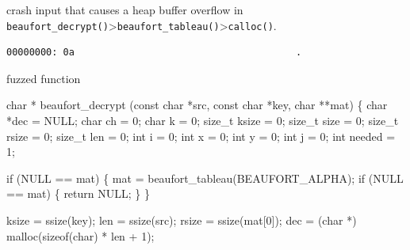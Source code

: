 \documentclass[
  a4paper,
]{scrreprt}
\newenvironment{Shaded}{\begin{snugshade}}{\end{snugshade}}
\newcommand{\ControlFlowTok}[1]{\textcolor[rgb]{0.85,0.12,0.09}{#1}}
\newcommand{\DataTypeTok}[1]{\textcolor[rgb]{0.47,0.16,0.63}{#1}}
\newcommand{\DecValTok}[1]{\textcolor[rgb]{0.47,0.16,0.63}{#1}}
\newcommand{\KeywordTok}[1]{\textcolor[rgb]{0.85,0.12,0.09}{#1}}
\newcommand{\NormalTok}[1]{\textcolor[rgb]{0.33,0.33,0.33}{#1}}
\newcommand{\OperatorTok}[1]{\textcolor[rgb]{0.00,0.46,0.62}{#1}}
\theoremstyle{definition}
\theoremstyle{remark}
\begin{document}
crash input that causes a heap buffer overflow in
\texttt{beaufort\_decrypt()}\textgreater{}\texttt{beaufort\_tableau()}\textgreater{}\texttt{calloc()}.

\begin{verbatim}
00000000: 0a                                       .
\end{verbatim}

fuzzed function

\begin{Shaded}
\begin{Highlighting}[numbers=left,,]

\DataTypeTok{char} \OperatorTok{*}
\NormalTok{beaufort\_decrypt }\OperatorTok{(}\DataTypeTok{const} \DataTypeTok{char} \OperatorTok{*}\NormalTok{src}\OperatorTok{,} \DataTypeTok{const} \DataTypeTok{char} \OperatorTok{*}\NormalTok{key}\OperatorTok{,} \DataTypeTok{char} \OperatorTok{**}\NormalTok{mat}\OperatorTok{)} \OperatorTok{\{}
  \DataTypeTok{char} \OperatorTok{*}\NormalTok{dec }\OperatorTok{=}\NormalTok{ NULL}\OperatorTok{;}
  \DataTypeTok{char}\NormalTok{ ch }\OperatorTok{=} \DecValTok{0}\OperatorTok{;}
  \DataTypeTok{char}\NormalTok{ k }\OperatorTok{=} \DecValTok{0}\OperatorTok{;}
  \DataTypeTok{size\_t}\NormalTok{ ksize }\OperatorTok{=} \DecValTok{0}\OperatorTok{;}
  \DataTypeTok{size\_t}\NormalTok{ size }\OperatorTok{=} \DecValTok{0}\OperatorTok{;}
  \DataTypeTok{size\_t}\NormalTok{ rsize }\OperatorTok{=} \DecValTok{0}\OperatorTok{;}
  \DataTypeTok{size\_t}\NormalTok{ len }\OperatorTok{=} \DecValTok{0}\OperatorTok{;}
  \DataTypeTok{int}\NormalTok{ i }\OperatorTok{=} \DecValTok{0}\OperatorTok{;}
  \DataTypeTok{int}\NormalTok{ x }\OperatorTok{=} \DecValTok{0}\OperatorTok{;}
  \DataTypeTok{int}\NormalTok{ y }\OperatorTok{=} \DecValTok{0}\OperatorTok{;}
  \DataTypeTok{int}\NormalTok{ j }\OperatorTok{=} \DecValTok{0}\OperatorTok{;}
  \DataTypeTok{int}\NormalTok{ needed }\OperatorTok{=} \DecValTok{1}\OperatorTok{;}

  \ControlFlowTok{if} \OperatorTok{(}\NormalTok{NULL }\OperatorTok{==}\NormalTok{ mat}\OperatorTok{)} \OperatorTok{\{}
\NormalTok{    mat }\OperatorTok{=}\NormalTok{ beaufort\_tableau}\OperatorTok{(}\NormalTok{BEAUFORT\_ALPHA}\OperatorTok{);}
    \ControlFlowTok{if} \OperatorTok{(}\NormalTok{NULL }\OperatorTok{==}\NormalTok{ mat}\OperatorTok{)} \OperatorTok{\{} \ControlFlowTok{return}\NormalTok{ NULL}\OperatorTok{;} \OperatorTok{\}}
  \OperatorTok{\}}

\NormalTok{  ksize }\OperatorTok{=}\NormalTok{ ssize}\OperatorTok{(}\NormalTok{key}\OperatorTok{);}
\NormalTok{  len }\OperatorTok{=}\NormalTok{ ssize}\OperatorTok{(}\NormalTok{src}\OperatorTok{);}
\NormalTok{  rsize }\OperatorTok{=}\NormalTok{ ssize}\OperatorTok{(}\NormalTok{mat}\OperatorTok{[}\DecValTok{0}\OperatorTok{]);}
\NormalTok{  dec }\OperatorTok{=} \OperatorTok{(}\DataTypeTok{char} \OperatorTok{*)}\NormalTok{ malloc}\OperatorTok{(}\KeywordTok{sizeof}\OperatorTok{(}\DataTypeTok{char}\OperatorTok{)} \OperatorTok{*}\NormalTok{ len }\OperatorTok{+} \DecValTok{1}\OperatorTok{);}


\end{Highlighting}
\end{Shaded}
\end{document}
